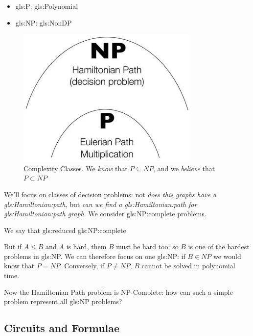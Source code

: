 \documentclass[]{article}
\begin{document}
\begin{itemize}
	\item \gls{gls:P}: \glsdesc{gls:Polynomial}
	\item \gls{gls:NP}: \glsdesc{gls:NonDP}
\end{itemize}

\begin{figure}[H]
	\begin{center}
		\caption[Complexity Classes]{Complexity Classes. We \emph{know} that $P \subseteq NP$, and we \emph{believe} that $P \subset NP$}\label{fig:PNP2}
		\includegraphics[width=0.8\textwidth]{PNP2}
	\end{center}
\end{figure}

We'll focus on classes of decision problems: not \emph{does this graphs have a \gls{gls:Hamiltonian:path}}, but \emph{can we find a \gls{gls:Hamiltonian:path} for \emph{\gls{gls:Hamiltonian:path}} graph}. We consider \gls{gls:NP:complete} problems.

We say that \glsdesc{gls:reduced} \glsdesc{gls:NP:complete}

But if $A \le B$ and $A$ is hard, them $B$ must be hard too: so $B$ is one of the hardest problems in \gls{gls:NP}. We can therefore focus on one  \gls{gls:NP}: if $B\in NP$ we would know that $P=NP$. Conversely, if $P \ne NP$, $B$ cannot be solved in polynomial time.

Now the Hamiltonian Path problem is NP-Complete: how can such a simple problem represent all \gls{gls:NP} problems?

\subsection{Circuits and Formulae}
\end{document}
